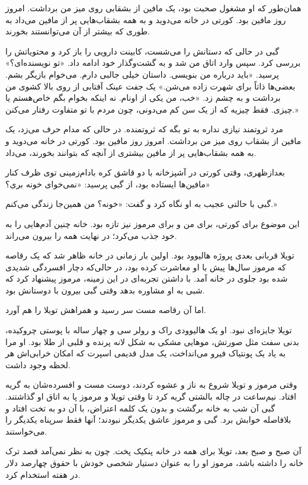 همان‌طور که او مشغول صحبت بود، یک مافین از بشقابی روی میز من برداشت. امروز روز مافین بود. کورتی در خانه می‌دوید و به همه بشقاب‌هایی پر از مافین می‌داد به طوری که بیشتر از آن می‌توانستند بخورند.

گبی در حالی که دستانش را می‌شست، کابینت دارویی را باز کرد و محتویاتش را بررسی کرد. سپس وارد اتاق من شد و به گشت‌وگذار خود ادامه داد. «تو نویسنده‌ای؟» پرسید. «باید درباره من بنویسی. داستان خیلی جالبی دارم. می‌خوام بازیگر بشم. بعضی‌ها ذاتاً برای شهرت زاده می‌شن.» یک جفت عینک آفتابی از روی بالا کشوی من برداشت و به چشم زد. «خب، من یکی از اونام. نه اینکه بخوام بگم خاص‌هستم یا چیزی. فقط چیزیه که از یک سن کم می‌دونی، چون مردم با تو متفاوت رفتار می‌کنن.»

مرد ثروتمند نیازی نداره به تو بگه که ثروتمنده. در حالی که مدام حرف می‌زد، یک مافین از بشقاب روی میز من برداشت. امروز روز مافین بود. کورتی در خانه می‌دوید و به همه بشقاب‌هایی پر از مافین بیشتری از آنچه که بتوانند بخورند، می‌داد.

بعدازظهری، وقتی کورتی در آشپزخانه با دو قاشق کره بادام‌زمینی توی ظرف کنار مافین‌ها ایستاده بود، از گبی پرسید: «نمی‌خوای خونه بری؟»

گبی با حالتی عجیب به او نگاه کرد و گفت: «خونه؟ من همین‌جا زندگی می‌کنم.»

این موضوع برای کورتی، برای من و برای مرموز نیز تازه بود. خانه چنین آدم‌هایی را به خود جذب می‌کرد؛ در نهایت همه را بیرون می‌راند.

تویلا قربانی بعدی پروژه هالیوود بود. اولین بار زمانی در خانه ظاهر شد که یک رقاصه که مرموز سال‌ها پیش با او معاشرت کرده بود، در حالی‌که دچار افسردگی شدیدی شده بود جلوی در خانه آمد. با داشتن تجربه‌ای در این زمینه، مرموز پیشنهاد کرد که شبی به او مشاوره بدهد وقتی گبی بیرون با دوستانش بود. 

اما آن رقاصه مست سر رسید و همراهش تویلا را هم آورد.

تویلا جایزه‌ای نبود. او یک هالیوودی راک و رولر سی و چهار ساله با پوستی چروکیده، بدنی سفت مثل صورتش، موهایی مشکی به شکل لانه پرنده و قلبی از طلا بود. او مرا به یاد یک پونتیاک فیرو می‌انداخت، یک مدل قدیمی اسپرت که امکان خرابی‌اش هر لحظه وجود داشت.

وقتی مرموز و تویلا شروع به ناز و عشوه کردند، دوست مست و افسرده‌شان به گریه افتاد. نیم‌ساعت در چاله بالشتی گریه کرد تا وقتی تویلا و مرموز پا به اتاق او گذاشتند. گبی آن شب به خانه برگشت و بدون یک کلمه اعتراض، با آن دو به تخت افتاد و بلافاصله خوابش برد. گبی و مرموز عاشق یکدیگر نبودند؛ آنها فقط سرپناه یکدیگر را می‌خواستند.

آن صبح و صبح بعد، تویلا برای همه در خانه پنکیک پخت. چون به نظر نمی‌آمد قصد ترک خانه را داشته باشد، مرموز او را به عنوان دستیار شخصی خودش با حقوق چهارصد دلار در هفته استخدام کرد.